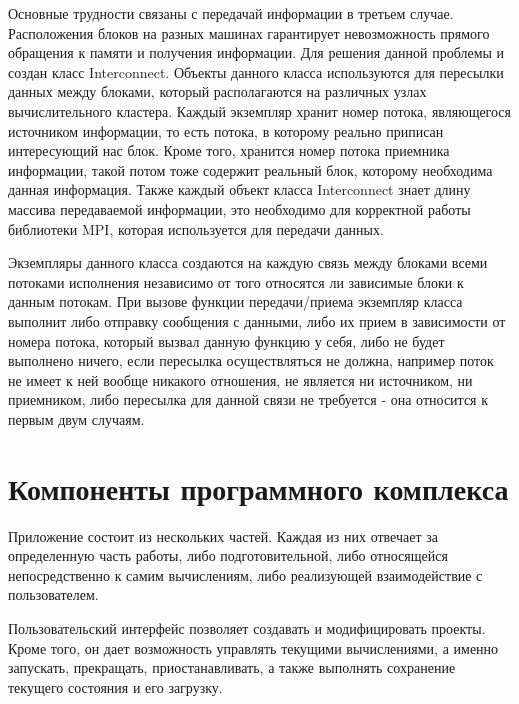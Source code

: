 \documentclass[a4paper, 14pt]{article}
\theoremstyle{definition}
\begin{document}
\par Основные трудности связаны с передачай информации в третьем случае. Расположения блоков на разных машинах гарантирует невозможность прямого обращения к памяти и получения информации. Для решения данной проблемы и создан класс Interconnect. Объекты данного класса используются для пересылки данных между блоками, который располагаются на различных узлах вычислительного кластера. Каждый экземпляр хранит номер потока, являющегося источником информации, то есть потока, в которому реально приписан интересующий нас блок. Кроме того, хранится номер потока приемника информации, такой потом тоже содержит реальный блок, которому необходима данная информация. Также каждый объект класса Interconnect знает длину массива передаваемой информации, это необходимо для корректной работы библиотеки MPI, которая используется для передачи данных.
\par Экземпляры данного класса создаются на каждую связь между блоками всеми потоками исполнения независимо от того относятся ли зависимые блоки к данным потокам. При вызове функции передачи/приема экземпляр класса выполнит либо отправку сообщения с данными, либо их прием в зависимости от номера потока, который вызвал данную функцию у себя, либо не будет выполнено ничего, если пересылка осуществляться не должна, например поток не имеет к ней вообще никакого отношения, не является ни источником, ни приемником, либо пересылка для данной связи не требуется - она относится к первым двум случаям.


\newpage
\section{Компоненты программного комплекса}

\par Приложение состоит из нескольких частей. Каждая из них отвечает за определенную часть работы, либо подготовительной, либо относящейся непосредственно к самим вычислениям, либо реализующей взаимодействие с пользователем.

\par Пользовательский интерфейс позволяет создавать и модифицировать проекты. Кроме того, он дает возможность управлять текущими вычислениями, а именно запускать, прекращать, приостанавливать, а также выполнять сохранение текущего состояния и его загрузку.
\end{document}
